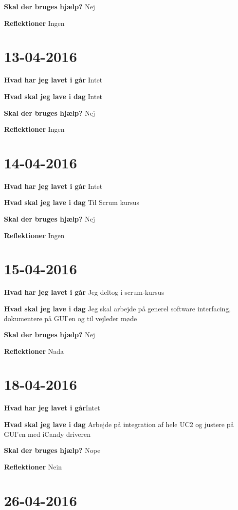 \documentclass{article}
\begin{document}
	\textbf{Skal der bruges hjælp?} Nej
	
	\textbf{Reflektioner} Ingen
	
	\section{13-04-2016}
	
	\textbf{Hvad har jeg lavet i går} Intet
	
	\textbf{Hvad skal jeg lave i dag} Intet
	
	\textbf{Skal der bruges hjælp?} Nej
	
	\textbf{Reflektioner} Ingen	
	
	\section{14-04-2016}
	
	\textbf{Hvad har jeg lavet i går} Intet
	
	\textbf{Hvad skal jeg lave i dag} Til Scrum kursus
	
	\textbf{Skal der bruges hjælp?} Nej
	
	\textbf{Reflektioner} Ingen
		
	\section{15-04-2016}
	
	\textbf{Hvad har jeg lavet i går} Jeg deltog i scrum-kursus
	
	\textbf{Hvad skal jeg lave i dag} Jeg skal arbejde på generel software interfacing, dokumentere på GUI'en og til vejleder møde
	
	\textbf{Skal der bruges hjælp?} Nej
	
	\textbf{Reflektioner} Nada
	
	\section{18-04-2016}
	
	\textbf{Hvad har jeg lavet i går}Intet
	
	\textbf{Hvad skal jeg lave i dag} Arbejde på integration af hele UC2 og justere på GUI'en med iCandy driveren
	
	\textbf{Skal der bruges hjælp?} Nope
	
	\textbf{Reflektioner} Nein
	
	\section{26-04-2016}
	
\end{document}
